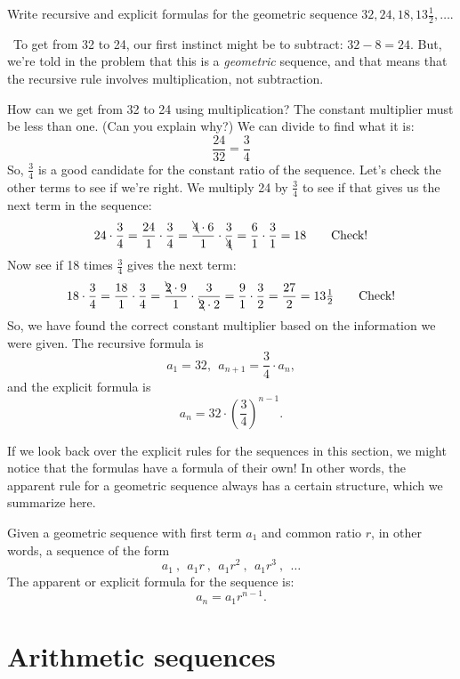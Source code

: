 \begin{boxex}
Write recursive and explicit formulas for the geometric sequence $32, 24, 18, 13\tfrac{1}{2}, \dotsc$.

\exsoln\ To get from 32 to 24, our first instinct might be to subtract: $32 - 8 = 24$. But, we're told in the problem that this is a \textit{geometric} sequence, and that means that the recursive rule involves multiplication, not subtraction.

How can we get from 32 to 24 using multiplication? The constant multiplier must be less than one. (Can you explain why?) We can divide to find what it is: \[\frac{24}{32} = \frac{3}{4}\]
So, $\frac{3}{4}$ is a good candidate for the constant ratio of the sequence. Let's check the other terms to see if we're right. We multiply 24 by $\frac{3}{4}$ to see if that gives us the next term in the sequence: \[24 \cdot\frac{3}{4} = \frac{24}{1}\cdot\frac{3}{4} = \frac{\bcancel{4} \cdot 6}{1}\cdot\frac{3}{\bcancel{4}} = \frac{6}{1}\cdot\frac{3}{1} = 18 \qquad\text{Check!}\]
Now see if 18 times $\frac{3}{4}$ gives the next term:
\[18 \cdot\frac{3}{4} = \frac{18}{1}\cdot\frac{3}{4} = \frac{\bcancel{2} \cdot 9}{1}\cdot\frac{3}{\bcancel{2} \cdot 2} = \frac{9}{1}\cdot\frac{3}{2} = \frac{27}{2} = 13\tfrac{1}{2} \qquad\text{Check!}\]
So, we have found the correct constant multiplier based on the information we were given. The recursive formula is
\[a_1 = 32, ~~ a_{n+1} = \frac{3}{4} \cdot a_n,\] and the explicit formula is
\[a_n = 32 \cdot \left( \frac{3}{4} \right)^{n-1}.\]
\end{boxex}

If we look back over the explicit rules for the sequences in this section, we might notice that the formulas have a formula of their own! In other words, the apparent rule for a geometric sequence always has a certain structure, which we summarize here.

\begin{boxdef}
Given a geometric sequence with first term $a_1$ and common ratio $r$, in other words, a sequence of the form \[a_1~,~~ a_1 r~,~~ a_1 r^2~,~~ a_1 r^3~,~~ \dotsc\]
The apparent or explicit formula for the sequence is: \[a_n = a_1 r^{n-1}.\]
\end{boxdef}


\section{Arithmetic sequences}
\label{sec:arithmeticseq}

